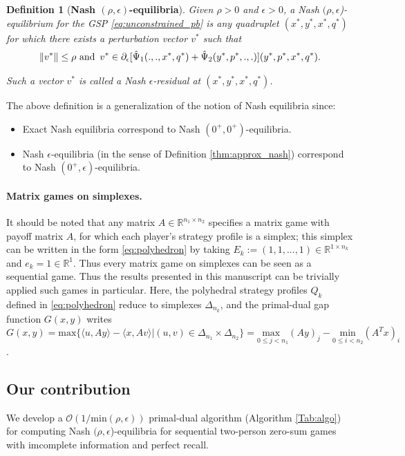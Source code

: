 \documentclass{article} %
\newtheorem{definition}[theorem]{Definition}
\begin{document}
\begin{definition}[\textbf{Nash $(\rho,\epsilon)$-equilibria}]
Given $\rho > 0$ and $\epsilon > 0$, a Nash
$(\rho,\epsilon$)-equilibrium for the GSP \eqref{eq:unconstrained_pb}
is any quadruplet $(x^*, y^*, x^*, q^*)$ for which
there exists a perturbation vector $v^*$ such that
\begin{eqnarray}
\|v^*\| \le \rho \text{ and}\hspace{.5em} v^* \in
\partial_\epsilon[\hat{\Psi}_1(., ., x^*, q^*) +
  \hat{\Psi}_2(y^*, p^*, ., .)](y^*,p^*,x^*,q^*).
\end{eqnarray}

Such a vector $v^*$ is called a Nash $\epsilon$-residual at $(x^*,
y^*, x^*, q^*)$.
\label{thm:cool_notion}
\end{definition}


The above definition is a generalization of the notion of Nash
equilibria since:
\begin{itemize}
\item Exact Nash equilibria correspond to Nash $(0^+,0^+)$-equilibria.
\item Nash $\epsilon$-equilibria (in the sense of Definition
  \ref{thm:approx_nash}) correspond to Nash $(0^+,\epsilon)$-equilibria.
\end{itemize}

\paragraph{Matrix games on simplexes.} It should be noted that any
matrix $A \in \mathbb{R}^{n_1 \times n_2}$ specifies a matrix
  game with payoff matrix $A$, for which each player's strategy
profile is a simplex; this simplex can be written in the form
\eqref{eq:polyhedron} by taking $E_k := (1, 1, ..., 1) \in
\mathbb{R}^{1 \times n_k}$ and $e_k = 1 \in \mathbb{R}^1$. Thus every
matrix game on simplexes can be seen as a sequential game.  Thus the
results presented in this manuscript can be trivially applied such
games in particular. Here, the polyhedral strategy profiles $Q_k$
defined in \eqref{eq:polyhedron} reduce to simplexes $\Delta_{n_k}$,
and the primal-dual gap function $G(x,y)$ writes $G(x, y) =
\mathrm{max}\{\langle u, Ay\rangle - \langle x, Av\rangle | (u,v) \in
\Delta_{n_1} \times \Delta_{n_2}\} = \underset{0 \le j <
  n_1}{\text{max }}(Ay)_j - \underset{0 \le i < n_2}{\text{min
}}(A^Tx)_i$.

\subsection{Our contribution}
We develop a $\mathcal{O}(1/\text{min}(\rho,\epsilon))$ primal-dual
algorithm (Algorithm \ref{Tab:algo}) for computing Nash $(\rho,
  \epsilon$)-equilibria for sequential two-person zero-sum games with
  imcomplete information and perfect recall.
\end{document}
